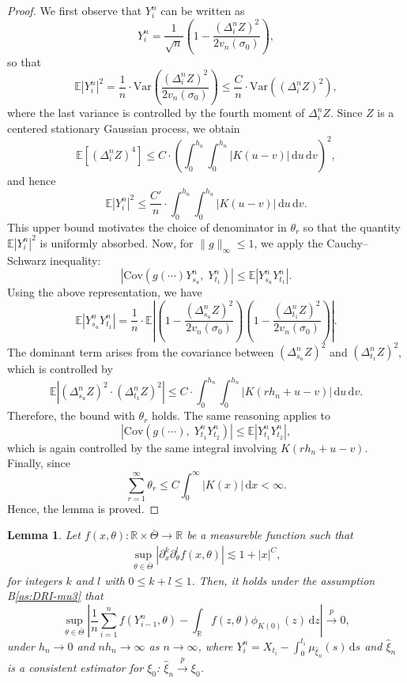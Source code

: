 \documentclass[a4paper,10pt,twoside]{article}
\newtheorem{lem}{Lemma}[section]
\numberwithin{equation}{section}
\def\R{\mathbb{R}}
\def\l{\left}
\def\r{\right}
\def\th{\theta}
\def\p{\partial}
\def\toP{\stackrel{p}{\longrightarrow}}
\def\E{\mathbb{E}}
\def\wh#1{\widehat{#1}}
\def\ol#1{\overline{#1}}
\def\Var{\mathrm{Var}}
\def\Cov{\mathrm{Cov}}
\def\df{\mathrm{d}}
\begin{document}
\begin{proof}
We first observe that $Y_i^n$ can be written as
\[
Y_i^n = \frac{1}{\sqrt{n}} \l( 1 - \frac{(\Delta_i^n Z)^2}{2 v_n(\sigma_0)} \r),
\]
so that
\[
\E|Y_i^n|^2 = \frac{1}{n} \cdot \Var\l( \frac{(\Delta_i^n Z)^2}{2 v_n(\sigma_0)} \r)
\le \frac{C}{n} \cdot \Var\l( (\Delta_i^n Z)^2 \r),
\]
where the last variance is controlled by the fourth moment of $\Delta_i^n Z$. Since $Z$ is a centered stationary Gaussian process, we obtain
\[
\E[(\Delta_i^n Z)^4] \le C \cdot \l( \int_0^{h_n} \!\! \int_0^{h_n} |K(u - v)|\,\df u\,\df v \r)^2,
\]
and hence
\[
\E|Y_i^n|^2 \le \frac{C'}{n} \cdot \int_0^{h_n} \!\! \int_0^{h_n} |K(u - v)|\,\df u\,\df v.
\]
This upper bound motivates the choice of denominator in $\theta_r$ so that the quantity $\E|Y_i^n|^2$ is uniformly absorbed.
Now, for $\|g\|_\infty \le 1$, we apply the Cauchy--Schwarz inequality:
\[
\l| \Cov\l( g(\cdots) Y_{s_u}^n,\; Y_{t_1}^n \r) \r|
\le \E\l| Y_{s_u}^n Y_{t_1}^n \r|.
\]
Using the above representation, we have
\[
\E\l| Y_{s_u}^n Y_{t_1}^n \r|
= \frac{1}{n} \cdot \E\l| \l( 1 - \frac{(\Delta_{s_u}^n Z)^2}{2 v_n(\sigma_0)} \r)
\l( 1 - \frac{(\Delta_{t_1}^n Z)^2}{2 v_n(\sigma_0)} \r) \r|.
\]
The dominant term arises from the covariance between $(\Delta_{s_u}^n Z)^2$ and $(\Delta_{t_1}^n Z)^2$, which is controlled by
\[
\E\l| (\Delta_{s_u}^n Z)^2 \cdot (\Delta_{t_1}^n Z)^2 \r|
\le C \cdot \int_0^{h_n} \!\! \int_0^{h_n} |K(r h_n + u - v)|\,\df u\,\df v.
\]
Therefore, the bound with $\theta_r$ holds.
The same reasoning applies to
\[
\l| \Cov\l( g(\cdots),\; Y_{t_1}^n Y_{t_2}^n \r) \r|
\le \E\l| Y_{t_1}^n Y_{t_2}^n \r|,
\]
which is again controlled by the same integral involving $K(r h_n + u - v)$. Finally, since
\[
\sum_{r=1}^\infty \theta_r \le C \int_0^\infty |K(x)|\,\df x < \infty. 
\]
Hence, the lemma is proved.
\end{proof}


\begin{lem}\label{lem:fY}
Let $f(x,\th): \R\times \ol{\Theta} \to \R$ be a measureble function such that 
\begin{align}
\sup_{\th \in \ol{\Theta}}|\p_x^k \p_\th^l f(x,\th)| \lesssim 1 + |x|^C, \label{cond:ergod2}
\end{align}
for integers $k$ and $l$ with $0\le k+l\le 1$. 
Then, it holds under the assumption B\ref{as:DRI-mu3} that
\[
\sup_{\th \in \ol{\Theta}}\l|\frac{1}{n} \sum_{i=1}^n f(Y_{i-1}^n,\th) - \int_\R f(z,\th)\phi_{K(0)}(z)\,\df z\r|\toP 0,
\]
under $h_n \to 0$ and $nh_n\to \infty$ as $n\to \infty$, where $Y_i^n= X_{t_i} - \int_0^{t_i} \mu_{\wh{\xi}_n}(s)\,\df s$ and 
$\wh{\xi}_n$ is a consistent estimator for $\xi_0$: $\wh{\xi}_n\toP \xi_0$. 
\end{lem}
\end{document}
